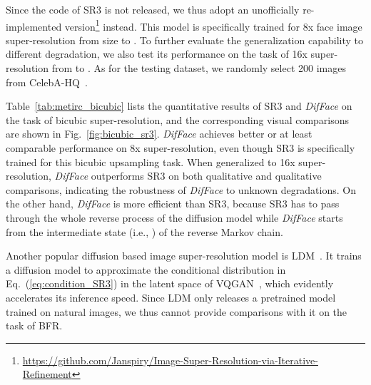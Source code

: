 \documentclass[10pt,twocolumn,letterpaper]{article}
\begin{document}
Since the code of SR3 is not released, we thus adopt an unofficially re-implemented version\footnote{\url{https://github.com/Janspiry/Image-Super-Resolution-via-Iterative-Refinement}} instead. This model is specifically trained for 8x face image super-resolution from size  to . To further evaluate the generalization capability to different degradation, we also test its performance on the task of 16x super-resolution from  to . As for the testing dataset, we randomly select 200 images from CelebA-HQ~\cite{karras2018progressive}.

Table~\ref{tab:metirc_bicubic} lists the quantitative results of SR3 and \textit{DifFace} on the task of bicubic super-resolution, and the corresponding visual comparisons are shown in Fig.~\ref{fig:bicubic_sr3}. \textit{DifFace} achieves better or at least comparable performance on 8x super-resolution, even though SR3 is specifically trained for this bicubic upsampling task. When generalized to 16x super-resolution, \textit{DifFace} outperforms SR3 on both qualitative and qualitative comparisons, indicating the robustness of \textit{DifFace} to unknown degradations. On the other hand, \textit{DifFace} is more efficient than SR3, because SR3 has to pass through the whole reverse process of the diffusion model while \textit{DifFace} starts from the intermediate state (i.e., ) of the reverse Markov chain.

Another popular diffusion based image super-resolution model is LDM~\cite{rombach2022high}. It trains a diffusion model to approximate the conditional distribution in Eq.~(\ref{eq:condition_SR3}) in the latent space of VQGAN~\cite{esser2021taming}, which evidently accelerates its inference speed. Since LDM only releases a pretrained model trained on natural images, we thus cannot provide comparisons with it on the task of BFR.
\end{document}
